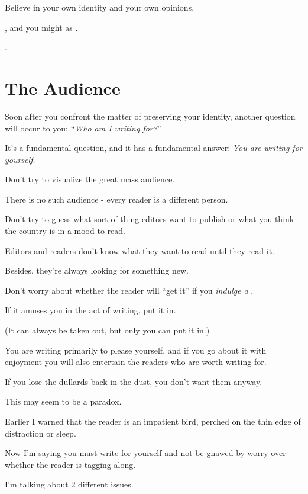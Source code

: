 \documentclass{book}
\numberwithin{equation}{section}
\begin{document}
Believe in your own identity and your own opinions.

, and you might as .

.


\chapter{The Audience}

Soon after you confront the matter of preserving your identity, another question will occur to you: ``\textit{Who am I writing for?}''

%
It's a fundamental question, and it has a fundamental answer: \textit{You are writing for yourself}.

Don't try to visualize the great mass audience.

There is no such audience - every reader is a different person.

Don't try to guess what sort of thing editors want to publish or what you think the country is in a mood to read.

Editors and readers don't know what they want to read until they read it.

Besides, they're always looking for something new.

%
Don't worry about whether the reader will ``get it'' if you \textit{indulge a }.

If it amuses you in the act of writing, put it in.

(It can always be taken out, but only you can put it in.)

You are writing primarily to please yourself, and if you go about it with enjoyment you will also entertain the readers who are worth writing for.

If you lose the dullards back in the dust, you don't want them anyway.

%
This may seem to be a paradox.

Earlier I warned that the reader is an impatient bird, perched on the thin edge of distraction or sleep.

Now I'm saying you must write for yourself and not be gnawed by worry over whether the reader is tagging along.

%
I'm talking about 2 different issues.
\end{document}
